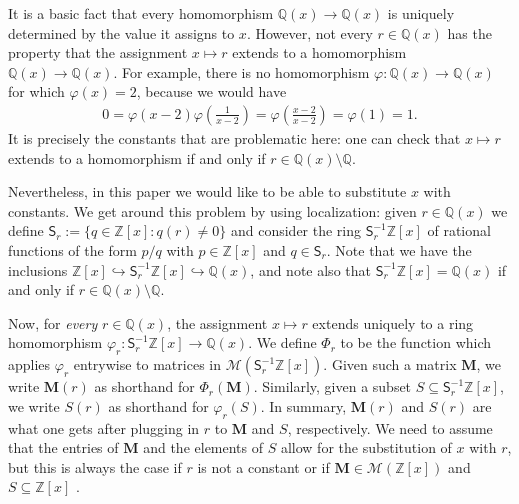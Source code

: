 \documentclass[a4paper, 11pt]{article}
\newcommand{\Z}{\mathbb{Z}}
\newcommand{\bM}{\bm{M}}
\newcommand{\indet}{x}
\newcommand{\polyring}{\Z[\indet]}
\newcommand{\polyS}{S}
\newcommand{\polyM}{\bM}
\begin{document}
	It is a basic fact that every homomorphism $\mathbb{Q}(x)\rightarrow\mathbb{Q}(x)$ is uniquely determined by the value it assigns to $x$. However, not every $r\in\mathbb{Q}(x)$ has the property that the assignment $x\mapsto r$ extends to a homomorphism $\mathbb{Q}(x)\rightarrow \mathbb{Q}(x)$. For example, there is no homomorphism $\varphi:\mathbb{Q}(x)\rightarrow\mathbb{Q}(x)$ for which $\varphi(x)=2$, because we would have
\begin{align*}
0=\varphi(x-2)\varphi\left(\frac{1}{x-2}\right)=\varphi\left(\frac{x-2}{x-2}\right)=\varphi(1)=1.
\end{align*}
It is precisely the constants that are problematic here: one can check that $x\mapsto r$ extends to a homomorphism if and only if $r\in\mathbb{Q}(x)\setminus \mathbb{Q}$. 

Nevertheless, in this paper we would like to be able to substitute $x$ with constants. We get around this problem by using localization: given $r\in\mathbb{Q}(x)$ we define $\mathsf{S}_r:=\{q\in\polyring : q(r)\neq 0\}$ and consider the ring $\mathsf{S}_r^{-1}\polyring$ of rational functions of the form $p/q$ with $p\in\polyring$ and $q\in\mathsf{S}_r$. Note that we have the inclusions $\polyring\hookrightarrow\mathsf{S}_r^{-1}\polyring\hookrightarrow\mathbb{Q}(x)$, and note also that $\mathsf{S}_r^{-1}\polyring=\mathbb{Q}(x)$ if and only if $r\in\mathbb{Q}(x)\setminus\mathbb{Q}$. 
	
	Now, for \emph{every} $r\in\mathbb{Q}(x)$, the assignment $x\mapsto r$ extends uniquely to a ring homomorphism $\varphi_r:\mathsf{S}_r^{-1}\polyring\rightarrow\mathbb{Q}(x)$. We define $\Phi_r$ to be the function which applies $\varphi_r$ entrywise to matrices in $\mathcal{M}(\mathsf{S}_r^{-1}\polyring)$. Given such a matrix $\polyM$, we write $\polyM(r)$ as shorthand for $\Phi_r(\polyM)$. Similarly, given a subset $\polyS\subseteq\mathsf{S}_r^{-1}\polyring$, we write $\polyS(r)$ as shorthand for $\varphi_r(\polyS)$. In summary, $\polyM(r)$ and $\polyS(r)$ are what one gets after plugging in $r$ to $\polyM$ and $\polyS$, respectively. We need to assume that the entries of $\polyM$ and the elements of $\polyS$ allow for the substitution of $x$ with $r$, but this is always the case if $r$ is not a constant or if $\polyM\in\mathcal{M}(\polyring)$ and $\polyS\subseteq\polyring$ .
	
\end{document}
